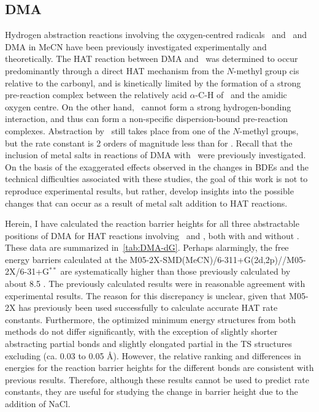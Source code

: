 \subsection{DMA}

Hydrogen abstraction reactions involving the oxygen-centred radicals \bno\ and
\cumo\ and DMA in MeCN have been previously investigated experimentally and
theoretically.\cite{Salamone2013} The HAT reaction between DMA and \bno\ was
determined to occur predominantly through a direct HAT mechanism from the
$N$-methyl group cis relative to the carbonyl, and is kinetically limited by the
formation of a strong pre-reaction complex between the relatively acid
$\alpha$-C-H of \bno\ and the amidic oxygen centre. On the other hand, \cumo\
cannot form a strong hydrogen-bonding interaction, and thus can form a
non-specific dispersion-bound pre-reaction complexes. Abstraction by \cumo\
still takes place from one of the $N$-methyl groups, but the rate constant is 2
orders of magnitude less than for \bno. Recall that the inclusion of metal salts
in reactions of DMA with \cumo\ were previously
investigated.\cite{Salamone2015metals} On the basis of the exaggerated effects
observed in the changes in BDEs and the technical difficulties associated with
these studies, the goal of this work is not to reproduce experimental results,
but rather, develop insights into the possible changes that can occur as a
result of metal salt addition to HAT reactions.

Herein, I have calculated the reaction barrier heights for all three
abstractable positions of DMA for HAT reactions involving \cumo\ and \bno, both
with and without \ch{NaCl}. These data are summarized in~\ref{tab:DMA-dG}.
Perhaps alarmingly, the free energy barriers calculated at the
M05-2X-SMD(MeCN)/6-311+G(2d,2p)//M05-2X/6-31+G$^{**}$ are systematically higher
than those previously calculated by about 8.5 \kcalmol.\cite{Salamone2013} The
previously calculated results were in reasonable agreement with experimental
results. The reason for this discrepancy is unclear, given that M05-2X has
previously been used successfully to calculate accurate HAT rate
constants.\cite{Galano2013} Furthermore, the optimized minimum energy structures
from both methods do not differ significantly, with the exception of slightly
shorter abstracting \ch{C-H} partial bonds and slightly elongated \ch{O-H}
partial in the TS structures excluding \ch{NaCl} (ca. 0.03 to 0.05 \AA).
However, the relative ranking and differences in energies for the reaction
barrier heights for the different \ch{C-H} bonds are consistent with previous
results. Therefore, although these results cannot be used to predict rate
constants, they are useful for studying the change in barrier height due to the
addition of NaCl.

